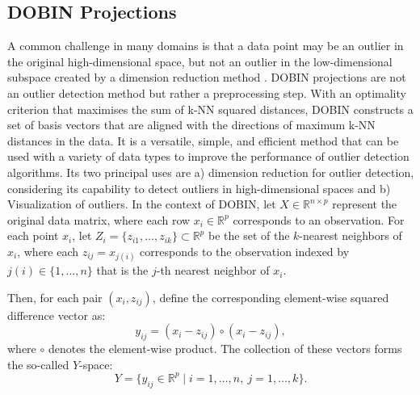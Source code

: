 \documentclass[12pt]{article}
\begin{document}

\subsection{DOBIN Projections}

A common challenge in many domains is that a data point may be an outlier in the original high-dimensional space, but not an outlier in the low-dimensional subspace created by a dimension reduction method \citep{Kandanaarachchi2021}. DOBIN projections are not an outlier detection method but rather a preprocessing step. With an optimality criterion that maximises the sum of k-NN squared distances, DOBIN constructs a set of basis vectors that are aligned with the directions of maximum k-NN distances in the data. It is a versatile, simple, and efficient method that can be used with a variety of data types to improve the performance of outlier detection algorithms. Its two principal uses are a) dimension reduction for outlier detection, considering its capability to detect outliers in high-dimensional spaces and b) Visualization of outliers. In the context of DOBIN, let \( X \in \mathbb{R}^{n \times p} \) represent the original data matrix, where each row \( x_i \in \mathbb{R}^p \) corresponds to an observation. For each point \( x_i \), let \( Z_i = \{ z_{i1}, \dots, z_{ik} \} \subset \mathbb{R}^p \) be the set of the \( k \)-nearest neighbors of \( x_i \), where each \( z_{ij} = x_{j(i)} \) corresponds to the observation indexed by \( j(i) \in \{1, \dots, n\} \) that is the \( j \)-th nearest neighbor of \( x_i \). 

Then, for each pair \( (x_i, z_{ij}) \), define the corresponding element-wise squared difference vector as:
\[
y_{ij} = (x_i - z_{ij}) \circ (x_i - z_{ij}),
\]
where \( \circ \) denotes the element-wise product. The collection of these vectors forms the so-called \( Y \)-space:
\[
Y = \{ y_{ij} \in \mathbb{R}^p \mid i = 1,\dots,n,\ j = 1,\dots,k \}.
\]
\end{document}
